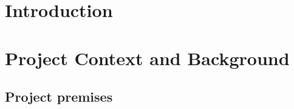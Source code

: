\documentclass[12pt,twoside]{article}
\date{September 2018}
\begin{document}






\clearpage{\pagestyle{empty}\cleardoublepage}

\begin{abstract}
\normalsize


\end{abstract}
\clearpage


\renewcommand{\abstractname}{Acknowledgements}
\begin{abstract}



\end{abstract}
\clearpage


\tableofcontents 

\clearpage{\pagestyle{empty}\cleardoublepage}
\setcounter{page}{1}
\fancyhead[LE,RO]{\slshape \rightmark}
\fancyhead[LO,RE]{\slshape \leftmark}


\section{Introduction}



\clearpage



\section{Project Context and Background}
\subsection{Project premises}

\end{document}
